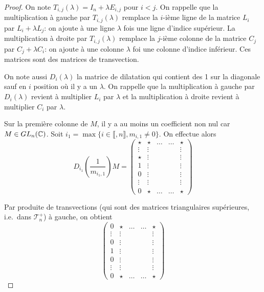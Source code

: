 \begin{proof}
    On note $T_{i,j}(\lambda)=I_{n}+\lambda E_{i,j}$ pour $i<j$. On rappelle que la multiplication à gauche par $T_{i,j}(\lambda)$ remplace la $i$-ième ligne de la matrice $L_{i}$ par $L_{i}+\lambda L_{j}$: on ajoute à une ligne $\lambda$ fois une ligne d'indice supérieur.
    La multiplication à droite par $T_{i,j}(\lambda)$ remplace la $j$-ième colonne de la matrice $C_{j}$ par $C_{j}+\lambda C_{i}$: on ajoute à une colonne $\lambda$ foi une colonne d'indice inférieur. Ces matrices sont des matrices de transvection.

    On note aussi $D_{i}(\lambda)$ la matrice de dilatation qui contient des 1 sur la diagonale sauf en $i$ position où il y a un $\lambda$. On rappelle que la multiplication à gauche par $D_{i}(\lambda)$ revient à multiplier $L_{i}$ par $\lambda$ et la multiplication à droite revient à multiplier $C_{i}$ par $\lambda$.

    Sur la première colonne de $M$, il y a au moins un coefficient non nul car $M\in GL_{n}(\mathbb{C})$. Soit $i_{1}=\max\lbrace i\in\llbracket,n\rrbracket,m_{i,1}\neq0\rbrace$. On effectue alors 
    \begin{equation}
        D_{i_{1}}\left(\frac{1}{m_{i_{1},1}}\right)M=
        \begin{pmatrix}
            \star & \star & \dots & \dots & \star\\
            \vdots & \vdots & & &\vdots\\
            \star & \vdots & & & \vdots\\
            1 & \vdots & & & \vdots\\
            0 & \vdots & & &\vdots\\
            \vdots & \vdots & & & \vdots\\
            0 & \star & \dots & \dots & \star
        \end{pmatrix}
    \end{equation}

    Par produite de transvections (qui sont des matrices triangulaires supérieures, i.e.~dans $\mathcal{T}_{n}^{+}$) à gauche, on obtient 
    \begin{equation}
        \begin{pmatrix}
            0 & \star & \dots & \dots & \star\\
            \vdots & \vdots & & &\vdots\\
            0 & \vdots & & & \vdots\\
            1 & \vdots & & & \vdots\\
            0 & \vdots & & &\vdots\\
            \vdots & \vdots & & & \vdots\\
            0 & \star & \dots & \dots & \star
        \end{pmatrix}
    \end{equation}


\end{proof}
